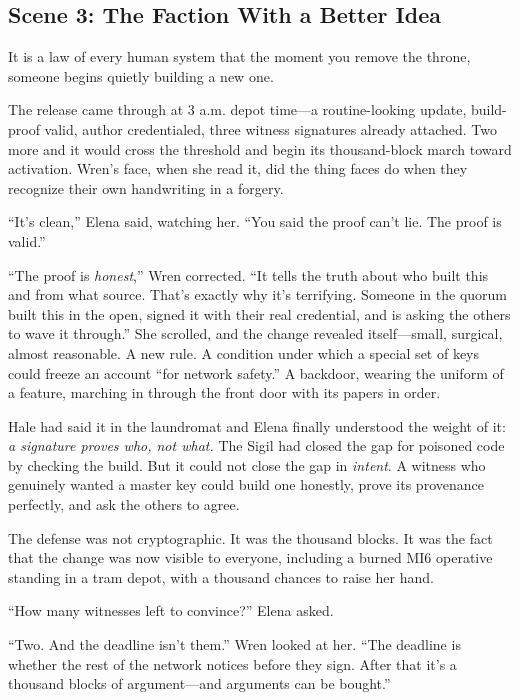 \hypertarget{scene-3-the-faction-with-a-better-idea}{%
\subsection{Scene 3: The Faction With a Better
Idea}\label{scene-3-the-faction-with-a-better-idea}}

It is a law of every human system that the moment you remove the throne,
someone begins quietly building a new one.

The release came through at 3 a.m. depot time---a routine-looking update,
build-proof valid, author credentialed, three witness signatures already
attached. Two more and it would cross the threshold and begin its thousand-block
march toward activation. Wren's face, when she read it, did the thing faces do
when they recognize their own handwriting in a forgery.

``It's clean,'' Elena said, watching her. ``You said the proof can't lie. The
proof is valid.''

``The proof is \emph{honest},'' Wren corrected. ``It tells the truth about who
built this and from what source. That's exactly why it's terrifying. Someone in
the quorum built this in the open, signed it with their real credential, and is
asking the others to wave it through.'' She scrolled, and the change revealed
itself---small, surgical, almost reasonable. A new rule. A condition under
which a special set of keys could freeze an account ``for network safety.'' A
backdoor, wearing the uniform of a feature, marching in through the front door
with its papers in order.

Hale had said it in the laundromat and Elena finally understood the weight of
it: \emph{a signature proves who, not what.} The Sigil had closed the gap for
poisoned code by checking the build. But it could not close the gap in
\emph{intent}. A witness who genuinely wanted a master key could build one
honestly, prove its provenance perfectly, and ask the others to agree.

The defense was not cryptographic. It was the thousand blocks. It was the fact
that the change was now visible to everyone, including a burned MI6 operative
standing in a tram depot, with a thousand chances to raise her hand.

``How many witnesses left to convince?'' Elena asked.

``Two. And the deadline isn't them.'' Wren looked at her. ``The deadline is
whether the rest of the network notices before they sign. After that it's a
thousand blocks of argument---and arguments can be bought.''

